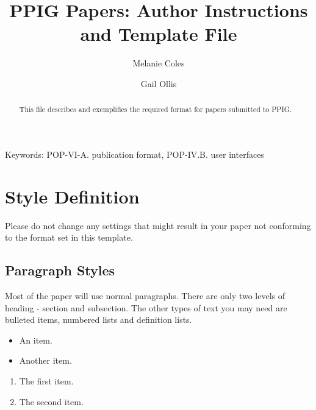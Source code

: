 \documentclass{ppig}
\begin{document}
\title{PPIG Papers: Author Instructions and Template File}

\author{Melanie Coles \and Gail Ollis}


\maketitle

\begin{abstract}
This file describes and exemplifies the required format for papers submitted to
PPIG. 
\end{abstract}

\small Keywords: POP-VI-A. publication format, POP-IV.B. user interfaces 


\section{Style Definition} \label{sec:Word-Paragraph-Styles}

Please do not change any settings that might result in your paper not
conforming to the format set in this template.

\subsection{Paragraph Styles}

Most of the paper will use normal paragraphs. There are only two levels of
heading - section and subsection.  The other types of text you may need are
bulleted items, numbered lists and definition lists.

\begin{itemize}
\item An item.
\item Another item.
\end{itemize}


\begin{enumerate}
\item The first item.
\item The second item.
\end{enumerate}
\end{document}
